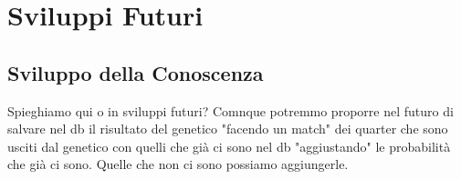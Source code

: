 \section{Sviluppi Futuri}
\subsection{Sviluppo della Conoscenza}
Spieghiamo qui o in sviluppi futuri? Comnque potremmo proporre nel futuro di salvare nel db 
il risultato del genetico "facendo un match" dei quarter che sono usciti dal genetico con quelli che già
ci sono nel db "aggiustando" le probabilità che già ci sono. Quelle che non ci sono possiamo aggiungerle. 
